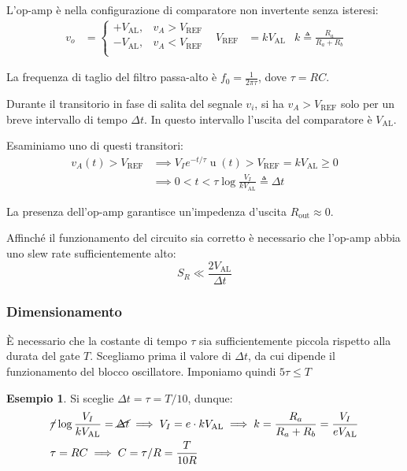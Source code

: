 \documentclass{article}
\newcommand{\var}[2]{#1_\text{#2}}
\DeclareMathOperator{\ustep}{u}
\theoremstyle{definition}
\newtheorem{example}{Esempio}
\begin{document}
\begin{figure}[ht]
    \centering
    \label{fig:sequencer-signal-hpf}
\end{figure}

L'op-amp è nella configurazione di comparatore non invertente senza isteresi:
\begin{align*}
    v_o &= \begin{cases}
        +\var{V}{AL}, & v_A > \var{V}{REF} \\
        -\var{V}{AL}, & v_A < \var{V}{REF} \\
    \end{cases}
    &
    \var{V}{REF} &= k \var{V}{AL}
    &
    k \triangleq \frac{R_a}{R_a + R_b}
\end{align*}

La frequenza di taglio del filtro passa-alto è \(f_0 = \frac{1}{2 \pi \tau}\), dove \(\tau = RC\).

Durante il transitorio in fase di salita del segnale \(v_i\), si ha \(v_A > \var{V}{REF}\) solo per un breve intervallo di tempo \(\Delta t\).
In questo intervallo l'uscita del comparatore è \(\var{V}{AL}\).

Esaminiamo uno di questi transitori:
\begin{align*}
    v_A(t) > \var{V}{REF} & \implies
    V_I e^{-t/\tau} \ustep(t) > \var{V}{REF} = k \var{V}{AL} \geq 0 \\
    & \implies 0 < t < \tau \log\frac{V_I}{k \var{V}{AL}} \triangleq \Delta t
    \label{eq:trigger-dt}
\end{align*}

La presenza dell'op-amp garantisce un'impedenza d'uscita \(\var{R}{out} \approx 0\).

Affinché il funzionamento del circuito sia corretto è necessario che l'op-amp abbia uno slew rate sufficientemente alto:
\begin{equation*}
    S_R \ll \frac{2 \var{V}{AL}}{\Delta t}
\end{equation*}

\subsubsection{Dimensionamento}
È necessario che la costante di tempo \(\tau\) sia sufficientemente piccola rispetto alla durata del gate \(T\). Scegliamo prima il valore di \(\Delta t\), da cui dipende il funzionamento del blocco oscillatore.
Imponiamo quindi \(5 \tau \le T\)

\begin{example}
    Si sceglie \(\Delta t = \tau = T/10\), dunque:
    \begin{align*}
        &\cancel{\tau} \log\frac{V_I}{k \var{V}{AL}} = \cancel{\Delta t} \implies
        V_I = e \cdot k \var{V}{AL} \implies
        k = \frac{R_a}{R_a + R_b} = \frac{V_I}{e \var{V}{AL}} \\
        &\tau = RC \implies C = \tau/R = \frac{T}{10R}
    \end{align*}
\end{example}
\end{document}
